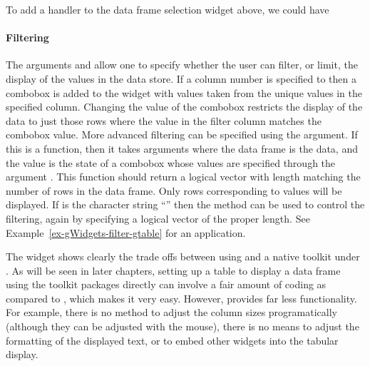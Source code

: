 To add a handler to the data frame selection widget above, we could have
\begin{Schunk}
\end{Schunk}



\paragraph{Filtering}
The arguments  and
 allow one to specify whether the user
can filter, or limit, the display of the values in the data store. If
a column number is specified to  then a combobox
is added to the widget with values taken from the unique values in the
specified column. Changing the value of the combobox restricts the
display of the data to just those rows where the value in the filter
column matches the combobox value. More advanced filtering can be
specified using the  argument. If this is
a function, then it takes arguments 
where the data frame is the data, and the  value is
the state of a combobox whose values are specified through the
argument . This function should return
a logical vector with length matching the number of rows in the data
frame.  Only rows corresponding to  values will be
displayed. If  is the character string
``'' then the  method can
be used to control the filtering, again by specifying a logical vector
of the proper length. See Example~\ref{ex-gWidgets-filter-gtable} for
an application.


The  widget shows clearly the trade offs between
using  and a native toolkit under \R. As will be seen in
later chapters, setting up a table to display a data frame using the
toolkit packages directly can involve a fair amount of coding as
compared to , which makes it very easy. However,
 provides far less functionality. For example, there is
no method to adjust the column sizes programatically (although they
can be adjusted with the mouse), there is no means to adjust the
formatting of the displayed text, or to embed other widgets into the
tabular display.

